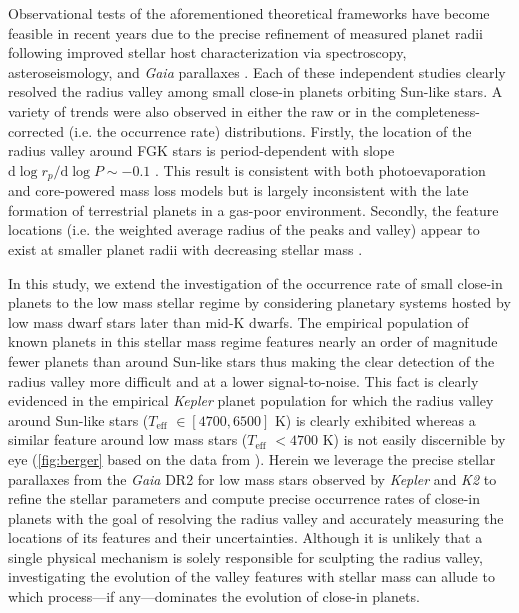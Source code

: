 \documentclass[twocolumn]{emulateapj}
\newcommand{\gaia}[1]{\emph{Gaia}#1}
\newcommand{\kepler}[1]{\emph{Kepler}#1}
\newcommand{\ktwo}[1]{\emph{K2}#1}
\newcommand{\teff}[1]{$T_{\text{eff}}$#1}
\begin{document}
Observational tests of the aforementioned theoretical frameworks have become feasible in recent years due to 
the precise refinement of measured planet radii following improved stellar host characterization via  
spectroscopy, asteroseismology, and \gaia{} parallaxes
\citep[e.g.][]{fulton17,berger18,fulton18,vaneylen18,martinez19}. Each of these independent studies clearly
resolved the radius valley among small close-in planets orbiting Sun-like stars.
A variety of trends were also observed in either
the raw or in the completeness-corrected (i.e. the occurrence rate) distributions. Firstly,
the location of the radius valley around FGK stars is period-dependent with slope
$\mathrm{d}\log{r_p} / \mathrm{d}\log{P} \sim -0.1$ \citep{vaneylen18,martinez19}. This result is consistent
with both photoevaporation and core-powered mass loss models but is largely inconsistent with the late formation
of terrestrial planets in a gas-poor environment. Secondly, the feature locations (i.e. the weighted
average radius of the peaks and valley) appear to exist at smaller planet radii with decreasing stellar
mass \citep{fulton18,wu19}.

In this study, we extend the investigation of the occurrence rate of small close-in planets to the low mass
stellar regime by considering planetary systems hosted by low mass dwarf stars later than mid-K dwarfs.
The empirical population of known planets in this stellar mass regime features nearly an order of magnitude
fewer planets than around Sun-like stars thus making the clear detection of the radius valley more
difficult and at a lower signal-to-noise. This fact is clearly evidenced in the empirical \kepler{} planet population
for which the radius valley around Sun-like stars (\teff{} $\in [4700,6500]$ K) is clearly exhibited whereas a similar
feature around low mass stars (\teff{} $< 4700$ K) is not easily discernible by eye (\autoref{fig:berger} based on
the data from \citealt{berger18}). Herein we leverage the precise stellar parallaxes from the \gaia{} DR2
for low mass stars observed by \kepler{} and \ktwo{} to refine the stellar parameters and compute precise
occurrence rates of close-in planets with the goal of resolving the radius valley and accurately measuring the
locations of its features and their uncertainties. Although it is unlikely that a single physical
mechanism is solely responsible for sculpting the radius valley, investigating the evolution of the valley features
with stellar mass can allude to which process---if any---dominates the evolution of close-in planets.
\end{document}
